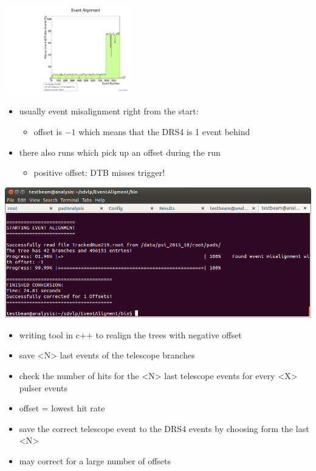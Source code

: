 \documentclass[9pt]{beamer}
\begin{document}
\begin{frame}
	\begin{center}
		\includegraphics[angle=270, width=5.5cm]{EventAlignment383}
	\end{center}
	\begin{itemize}
		\item usually event misalignment right from the start:
		\begin{itemize}
			\item offset is $-1$ which means that the DRS4 is 1 event behind
		\end{itemize}
		\item there also runs which pick up an offset during the run
		\begin{itemize}
			\item positive offset: DTB misses trigger!
		\end{itemize}
	\end{itemize}
\end{frame}
\begin{frame}
	\begin{center}
		\includegraphics[width=.8\textwidth]{Prog}
	\end{center}
	\begin{itemize}
		\item writing tool in c++ to realign the trees with negative offset
		\item save <N> last events of the telescope branches
		\item check the number of hits for the <N> last telescope events for every <X> pulser events
		\item offset = lowest hit rate 
		\item save the correct telescope event to the DRS4 events by choosing form the last <N>
		\item may correct for a large number of offsets
	\end{itemize}
\end{frame}
\end{document}
